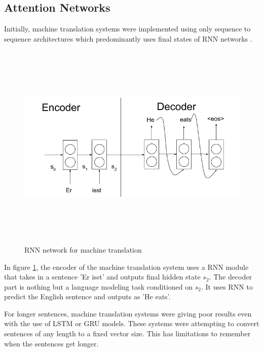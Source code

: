 \documentclass[a4paper, 11pt]{article}
\begin{document}
\subsection{Attention Networks}


 Initially, machine translation systems were implemented using only sequence to sequence architectures which predominantly uses final states of RNN networks \parencite{sutskever2014sequence}. 

\begin{figure}[H]
    \centering
    \includegraphics[width=\textwidth,height=10cm,keepaspectratio=true]
    {machine-translation-1.png}
    \caption{
        RNN network for machine translation \parencite{GerElmo}
    }
    \label{fig:machine-translation-1}
\end{figure}

In figure \ref{fig:machine-translation-1}, the encoder of the machine translation system uses a RNN module that takes in a sentence 'Er isst' and outputs final hidden state $s_2$. The decoder part is nothing but a language modeling task conditioned on $s_2$. It uses RNN to predict the English sentence and outputs as 'He eats'. 

For longer sentences, machine translation systems were giving poor results even with the use of LSTM or GRU models. These systems were attempting to convert sentences of any length to a fixed vector size. This has limitations to remember when the sentences get longer. 
\end{document}
